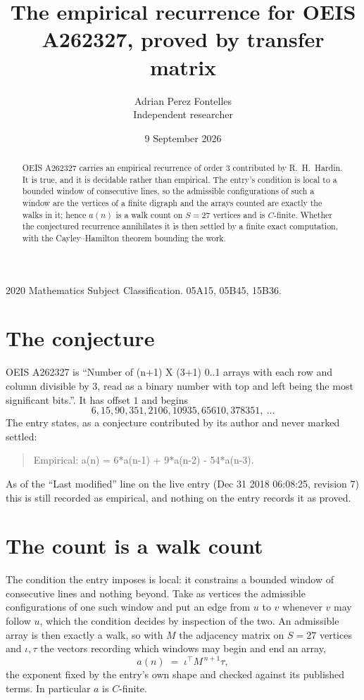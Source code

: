 \documentclass[11pt,a4paper]{article}
\title{The empirical recurrence for OEIS A262327, proved by transfer matrix}
\author{Adrian Perez Fontelles\\ \small Independent researcher}
\date{9 September 2026}
\theoremstyle{plain}
\theoremstyle{definition}
\begin{document}
\maketitle

\begin{abstract}
OEIS A262327 carries an empirical recurrence of order $3$ contributed by R.~H.~Hardin. It is
true, and it is decidable rather than empirical. The entry's condition is local to a bounded window of consecutive lines, so
the admissible configurations of such a window are the vertices of a finite digraph and the
arrays counted are exactly the walks in it; hence $a(n)$ is a walk count on $S=27$ vertices
and is $C$-finite. Whether the conjectured recurrence annihilates it is then settled by a
finite exact computation, with the Cayley--Hamilton theorem bounding the work.
\end{abstract}

\noindent\small 2020 Mathematics Subject Classification. 05A15, 05B45, 15B36.\normalsize

\section{The conjecture}

OEIS A262327 is ``Number of (n+1) X (3+1) 0..1 arrays with each row and column divisible by 3, read as a binary number with top and left being the most significant bits.''. It has offset $1$ and begins
\[
6, 15, 90, 351, 2106, 10935, 65610, 378351,\ \dots
\]
The entry states, as a conjecture contributed by its author and never marked settled:
\begin{quote}
Empirical: a(n) = 6*a(n-1) + 9*a(n-2) - 54*a(n-3).
\end{quote}
As of the ``Last modified'' line on the live entry (Dec 31 2018 06:08:25, revision 7) this is still
recorded as empirical, and nothing on the entry records it as proved.

\section{The count is a walk count}

The condition the entry imposes is local: it constrains a bounded window of consecutive lines and nothing beyond. Take as
vertices the admissible configurations of one such window and put an edge from $u$ to $v$
whenever $v$ may follow $u$, which the condition decides by inspection of the two. An
admissible array is then exactly a walk, so with $M$ the adjacency matrix on $S=27$ vertices
and $\iota,\tau$ the vectors recording which windows may begin and end an array,
\[
a(n)\;=\;\iota^{\!\top}M^{\,n+1}\tau ,
\]
the exponent fixed by the entry's own shape and checked against its published terms. In
particular $a$ is $C$-finite.
\end{document}
